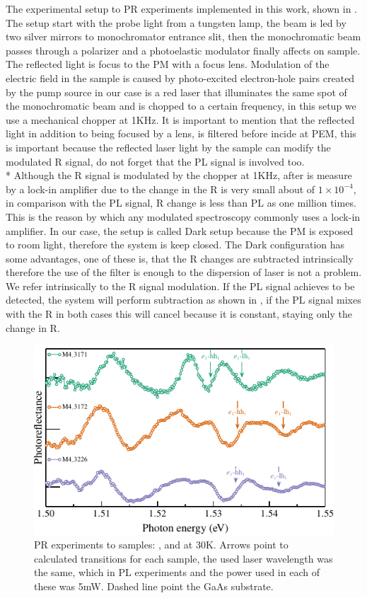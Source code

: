The experimental setup to PR experiments implemented in this work, shown in . The setup start with the probe light from a tungsten lamp, the beam is led by two silver mirrors to monochromator entrance slit, then the monochromatic beam passes through a polarizer and a photoelastic modulator finally affects on sample. The reflected light is focus to the PM with a focus lens. Modulation of the electric field in the sample is caused by photo-excited electron-hole pairs created by the pump source in our case is a red laser that illuminates the same spot of the monochromatic beam and is chopped to a certain frequency, in this setup we use a mechanical chopper at 1KHz. It is important to mention that the reflected light in addition to being  focused by a lens, is filtered before incide at PEM, this is important because the reflected laser light by the sample can modify the modulated R signal, do not forget that the PL signal is involved too. \\*
Although the R signal is modulated by the chopper at 1KHz, after is measure by a lock-in amplifier due to the change in the R is very small about of  $1\times 10^{-4}$,  in comparison with the  PL signal, R change is less than PL as one million times. This is the reason by which any modulated spectroscopy commonly uses a lock-in amplifier. In our case, the setup is called Dark\cite{misiewicz1999photoreflectance} setup because the PM is exposed to room light, therefore the system is keep closed. The  Dark configuration has some advantages, one of these is, that the R changes are subtracted intrinsically therefore the use of the filter is enough to the dispersion of laser is not a problem.  We refer intrinsically to the R signal modulation. If the PL signal achieves to be detected,  the system will perform subtraction as shown in , if the PL signal mixes with the R in both cases this will cancel because it is constant,  staying only the change in R. 
\begin{figure}[ht!]
	\centering
	\includegraphics[width=\textwidth]{../figures/chapter-3/pr-plots/build-ruco/pr-set1.pdf}
	\caption{ PR experiments to samples: ,  and  at 30K. Arrows point to calculated transitions for each sample, the used laser wavelength was the same, which in PL experiments and the power used in each of these was 5mW. Dashed line point the GaAs substrate.}
	\label{fig:chapter-3-PR-PLOT-SET1}
\end{figure}

